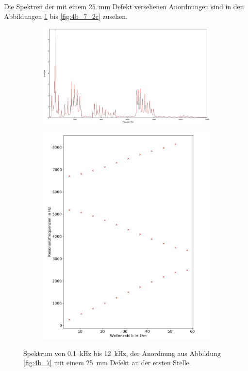 Die Spektren der mit einem 25~mm Defekt versehenen Anordnungen sind in den Abbildungen \ref{fig:4b_7_2a} bis \ref{fig:4b_7_2c} zusehen.
\begin{figure}
\centering
\begin{subfigure}{0.65\textwidth}
\includegraphics[width=\textwidth]{content/messungen/Chapter4b/4b_7_2a.jpg}
\end{subfigure}
\begin{subfigure}{0.34\textwidth}
\includegraphics[width=\textwidth]{content/Scripts/4b_7_2a.jpg}
\end{subfigure}
\caption{Spektrum von 0.1~kHz bis 12~kHz, der Anordnung aus Abbildung \ref{fig:4b_7} mit einem 25~mm Defekt an der ersten Stelle.}
\label{fig:4b_7_2a}
\end{figure}
